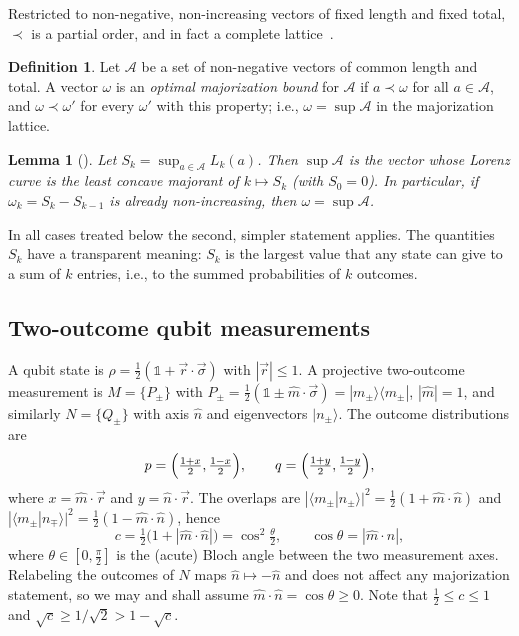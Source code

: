\documentclass[aps,pra,twocolumn,superscriptaddress,nofootinbib,floatfix]{revtex4-2}
\newtheorem{lemma}{Lemma}
\theoremstyle{definition}
\newtheorem{definition}{Definition}
\newcommand{\bra}[1]{\langle #1|}
\newcommand{\ket}[1]{|#1\rangle}
\newcommand{\vecr}{\vec r}
\newcommand{\mhat}{\hat m}
\newcommand{\nhat}{\hat n}
\newcommand{\vsigma}{\vec\sigma}
\newcommand{\maj}{\prec}
\newcommand{\sqc}{\sqrt{c}}
\begin{document}
Restricted to non-negative, non-increasing vectors of fixed length and fixed
total, $\maj$ is a partial order, and in fact a complete
lattice~\cite{CicaleseVaccaro2002,Bosyk2019}.

\begin{definition}
Let $\mathcal{A}$ be a set of non-negative vectors of common length and total.
A vector $\omega$ is an
\emph{optimal majorization bound} for $\mathcal{A}$ if $a\maj\omega$ for all
$a\in\mathcal{A}$, and $\omega\maj\omega'$ for every $\omega'$ with this
property; i.e., $\omega=\sup\mathcal{A}$ in the majorization lattice.
\end{definition}

\begin{lemma}[\cite{CicaleseVaccaro2002,Bosyk2019}]
\label{lem:sup}
Let $S_k=\sup_{a\in\mathcal{A}}L_k(a)$. Then $\sup\mathcal{A}$ is the vector whose
Lorenz curve is the least concave majorant of $k\mapsto S_k$ (with $S_0=0$). In
particular, if $\omega_k=S_k-S_{k-1}$ is already non-increasing, then
$\omega=\sup\mathcal{A}$.
\end{lemma}

In all cases treated below the second, simpler statement applies.
The quantities $S_k$ have a transparent meaning: $S_k$ is the largest value that
any state can give to a sum of $k$ entries, i.e., to the summed probabilities of
$k$ outcomes.

\subsection{Two-outcome qubit measurements}

A qubit state is $\rho=\tfrac12(\mathds{1}+\vecr\cdot\vsigma)$ with $|\vecr|\le1$.
A projective two-outcome measurement is $M=\{P_\pm\}$ with
$P_\pm=\tfrac12(\mathds{1}\pm\mhat\cdot\vsigma)=\ket{m_\pm}\!\bra{m_\pm}$,
$|\mhat|=1$, and similarly $N=\{Q_\pm\}$ with axis $\nhat$ and eigenvectors
$\ket{n_\pm}$.
The outcome distributions are
\begin{equation}
  p=\Bigl(\tfrac{1+x}{2},\tfrac{1-x}{2}\Bigr),\qquad
  q=\Bigl(\tfrac{1+y}{2},\tfrac{1-y}{2}\Bigr),
  \label{eq:pq}
\end{equation}
where $x=\mhat\cdot\vecr$ and $y=\nhat\cdot\vecr$.
The overlaps are $|\langle m_\pm|n_\pm\rangle|^2=\tfrac12(1+\mhat\cdot\nhat)$ and
$|\langle m_\pm|n_\mp\rangle|^2=\tfrac12(1-\mhat\cdot\nhat)$, hence
\begin{equation}
  c=\tfrac12\bigl(1+|\mhat\cdot\nhat|\bigr)=\cos^2\tfrac{\theta}{2},
  \qquad \cos\theta=|\mhat\cdot\nhat|,
  \label{eq:c}
\end{equation}
where $\theta\in[0,\frac{\pi}{2}]$ is the (acute) Bloch angle between the two
measurement axes.
Relabeling the outcomes of $N$ maps $\nhat\mapsto-\nhat$ and does not affect any
majorization statement, so we may and shall assume $\mhat\cdot\nhat=\cos\theta\ge0$.
Note that $\tfrac12\le c\le1$ and $\sqc\ge1/\sqrt2>1-\sqc$.
\end{document}
